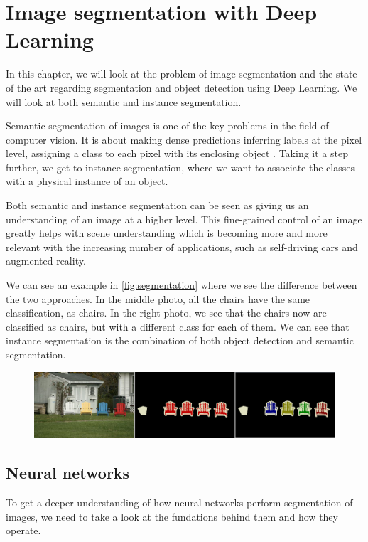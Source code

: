 \chapter{Image segmentation with Deep Learning}
In this chapter, we will look at the problem of image segmentation and the state of the art regarding segmentation and object detection using Deep Learning. We will look at both semantic and instance segmentation.

Semantic segmentation of images is one of the key problems in the field of computer vision. It is about making dense predictions inferring labels at the pixel level, assigning a class to each pixel with its enclosing object \citet{Garcia-Garcia2017}. Taking it a step further, we get to instance segmentation, where we want to associate the classes with a physical instance of an object. 

Both semantic and instance segmentation can be seen as giving us an understanding of an image at a higher level. This fine-grained control of an image greatly helps with scene understanding which is becoming more and more relevant with the increasing number of applications, such as self-driving cars and augmented reality. 

We can see an example in \autoref{fig:segmentation} where we see the difference between the two approaches. In the middle photo, all the chairs have the same classification, as chairs. In the right photo, we see that the chairs now are classified as chairs, but with a different class for each of them. We can see that instance segmentation is the combination of both object detection and semantic segmentation.

\begin{figure}[H]
	\centering
	\includegraphics[width=\linewidth]{fig/se.png}
	\label{fig:segmentation}
\end{figure}


\section{Neural networks}
To get a deeper understanding of how neural networks perform segmentation of images, we need to take a look at the fundations behind them and how they operate.

